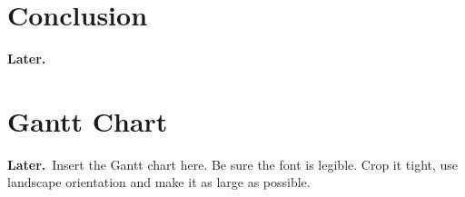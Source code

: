 \documentclass[onecolumn,10pt]{IEEEtran}
\newcommand{\myroot}{../}
\newcommand{\Later}{\textbf{Later.}}
\begin{document}
\section{Conclusion}
\Later





\appendix
\section{Gantt Chart}
\Later\ Insert the Gantt chart here. Be sure the font is legible. Crop it tight, use landscape orientation and make it as large as possible.
\end{document}
